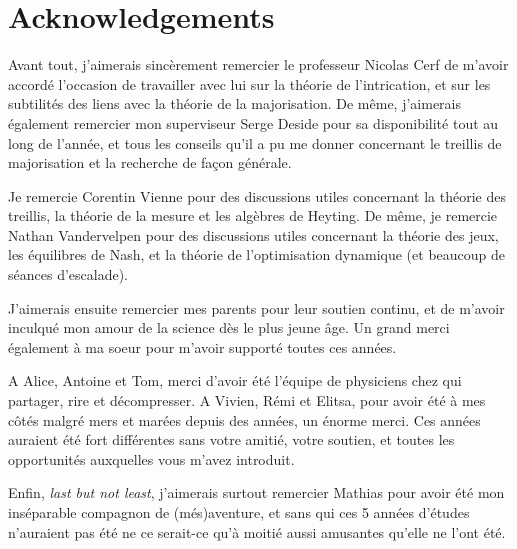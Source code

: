 \section*{Acknowledgements}

Avant tout, j'aimerais sincèrement remercier le professeur Nicolas Cerf de m'avoir accordé l'occasion de travailler avec lui sur la théorie de l'intrication, et sur les subtilités des liens avec la théorie de la majorisation. De même, j'aimerais également remercier mon superviseur Serge Deside pour sa disponibilité tout au long de l'année, et tous les conseils qu'il a pu me donner concernant le treillis de majorisation et la recherche de façon générale.

Je remercie Corentin Vienne pour des discussions utiles concernant la théorie des treillis, la théorie de la mesure et les algèbres de Heyting. De même, je remercie Nathan Vandervelpen pour des discussions utiles concernant la théorie des jeux, les équilibres de Nash, et la théorie de l'optimisation dynamique (et beaucoup de séances d'escalade).

J'aimerais ensuite remercier mes parents pour leur soutien continu, et de m'avoir inculqué mon amour de la science dès le plus jeune âge. Un grand merci également à ma soeur pour m'avoir supporté toutes ces années.

A Alice, Antoine et Tom, merci d'avoir été l'équipe de physiciens chez qui partager, rire et décompresser. A Vivien, Rémi et Elitsa, pour avoir été à mes côtés malgré mers et marées depuis des années, un énorme merci. Ces années auraient été fort différentes sans votre amitié, votre soutien, et toutes les opportunités auxquelles vous m'avez introduit.

Enfin, \textit{last but not least}, j'aimerais surtout remercier Mathias pour avoir été mon inséparable compagnon de (més)aventure, et sans qui ces 5 années d'études n'auraient pas été ne ce serait-ce qu'à moitié aussi amusantes qu'elle ne l'ont été.

